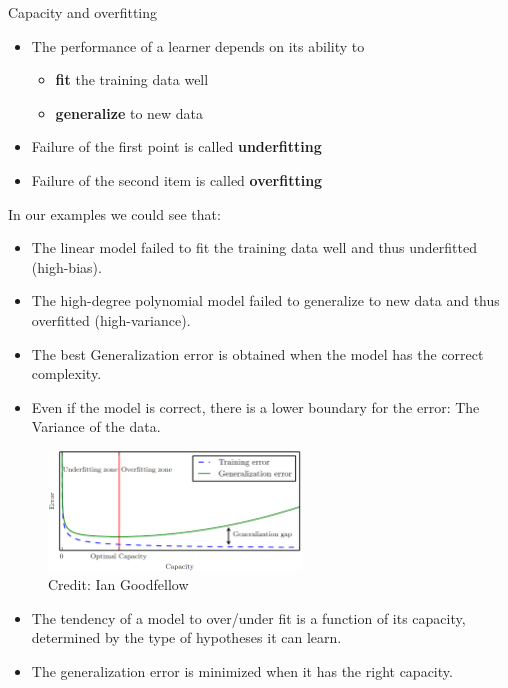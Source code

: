 \documentclass[11pt,compress,t,notes=noshow, xcolor=table]{beamer}
\begin{document}
\begin{vbframe}{Capacity and overfitting}

\begin{itemize}
  \item 
    The performance of a learner depends on its ability to 
    \begin{itemize}
      \item \textbf{fit} the training data well
      \item \textbf{generalize} to new data
    \end{itemize}  
  \item Failure of the first point is called \textbf{underfitting}
  \item Failure of the second item is called \textbf{overfitting}
\end{itemize}  


In our examples we could see that:

\begin{itemize}
  \item The linear model failed to fit the training data well and thus underfitted (high-bias).
  \item The high-degree polynomial model failed to generalize to new data and thus overfitted (high-variance).
  \item The best Generalization error is obtained when the model has the correct complexity.
  \item Even if the model is correct, there is a lower boundary for the error: The Variance of the data.
\end{itemize}

\framebreak

\begin{figure}
  \centering
  \includegraphics[width = 0.6\textwidth]{figure_man/lcurve_1.png}
  \tiny{\\ Credit: Ian Goodfellow}
\end{figure}


\begin{itemize}
  \item The tendency of a model to over/under fit is a function of its capacity, determined by the type of hypotheses it can learn.
  \item The generalization error is minimized when it has the right capacity.
\end{itemize}
\end{vbframe}


\endlecture
\end{document}

